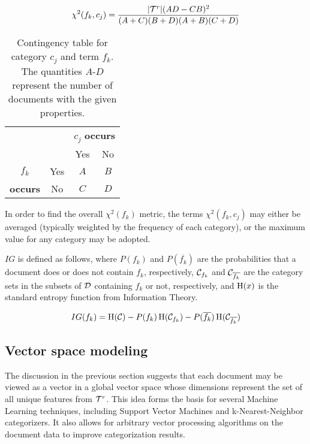 \begin{align*}
\chi^2(f_k,c_j) & = \frac{|\mathcal{T}^r|(AD-CB)^2}{(A+C)(B+D)(A+B)(C+D)} \\
\end{align*}


\begin{table}
\begin{center}
\begin{tabular}{|c|c|c|c|}
\cline{3-4}
\multicolumn{2}{c|}{} & \multicolumn{2}{c|}{$c_j$ \textbf{occurs}} \\
\cline{3-4}
\multicolumn{2}{c|}{} & Yes & No \\
\hline
$f_k$           & Yes & $A$ & $B$ \\
\cline{2-4}
\textbf{occurs} & No  & $C$ & $D$ \\
\hline
\end{tabular}
\end{center}
\caption[Contingency table for category $c_j$ and term $f_k$]
 {Contingency table for category $c_j$ and term $f_k$.  The
  quantities $A$-$D$ represent the number of documents with the given
  properties.}
\label{termcat-contingency}
\end{table}

In order to find the overall $\chi^2(f_k)$ metric, the terms
$\chi^2(f_k,c_j)$ may either be averaged (typically weighted by the
frequency of each category), or the maximum value for any category may
be adopted. \cite{yang:97}

$IG$ is defined as follows, where $P(f_k)$ and $P(\overline{f_k})$ are
the probabilities that a document does or does not contain $f_k$,
respectively, $\mathcal{C}_{f_k}$ and $\mathcal{C}_{\overline{f_k}}$ are the
category sets in the subsets of $\mathcal{D}$ containing $f_k$ or not,
respectively, and $\operatorname{H}(x)$ is the standard entropy function from
Information Theory. \cite[ch. 2]{manning:99}

\begin{equation*}
        IG(f_k) = \operatorname{H}(\mathcal{C})
                  - P(f_k) \operatorname{H}(\mathcal{C}_{f_k})
	          - P(\overline{f_k}) \operatorname{H}(\mathcal{C}_{\overline{f_k}})
\end{equation*}


\subsection{Vector space modeling}

The discussion in the previous section suggests that each document may
be viewed as a vector in a global vector space whose dimensions
represent the set of all unique features from $\mathcal{T}^r$.  This idea
forms the basis for several Machine Learning techniques, including
Support Vector Machines and k-Nearest-Neighbor categorizers.  It also
allows for arbitrary vector processing algorithms on the document data
to improve categorization results.

